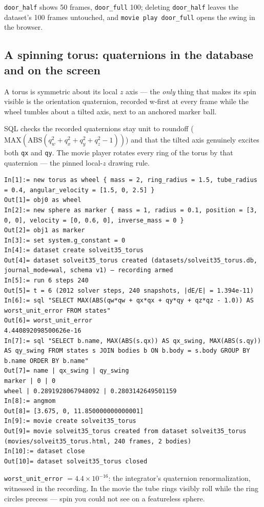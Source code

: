 \documentclass[11pt]{article}
\newcommand{\code}[1]{\texttt{#1}}
\begin{document}
\code{door\_half} shows 50 frames, \code{door\_full} 100; deleting
\code{door\_half} leaves the dataset's 100 frames untouched, and
\code{movie play door\_full} opens the swing in the browser.

\subsection{A spinning torus: quaternions in the database and on the screen}

A torus is symmetric about its local $z$ axis --- the \emph{only}
thing that makes its spin visible is the orientation quaternion,
recorded w-first at every frame while the wheel tumbles about a tilted
axis, next to an anchored marker ball.

SQL checks the recorded quaternions stay unit to roundoff
($\mathrm{MAX}(\mathrm{ABS}(q_w^2+q_x^2+q_y^2+q_z^2-1))$) and that the
tilted axis genuinely excites both \code{qx} and \code{qy}. The movie
player rotates every ring of the torus by that quaternion --- the
pinned local-$z$ drawing rule.

\begin{lstlisting}
In[1]:= new torus as wheel { mass = 2, ring_radius = 1.5, tube_radius = 0.4, angular_velocity = [1.5, 0, 2.5] }
Out[1]= obj0 as wheel
In[2]:= new sphere as marker { mass = 1, radius = 0.1, position = [3, 0, 0], velocity = [0, 0.6, 0], inverse_mass = 0 }
Out[2]= obj1 as marker
In[3]:= set system.g_constant = 0
In[4]:= dataset create solveit35_torus
Out[4]= dataset solveit35_torus created (datasets/solveit35_torus.db, journal_mode=wal, schema v1) — recording armed
In[5]:= run 6 steps 240
Out[5]= t = 6 (2012 solver steps, 240 snapshots, |dE/E| = 1.394e-11)
In[6]:= sql "SELECT MAX(ABS(qw*qw + qx*qx + qy*qy + qz*qz - 1.0)) AS worst_unit_error FROM states"
Out[6]= worst_unit_error
4.440892098500626e-16
In[7]:= sql "SELECT b.name, MAX(ABS(s.qx)) AS qx_swing, MAX(ABS(s.qy)) AS qy_swing FROM states s JOIN bodies b ON b.body = s.body GROUP BY b.name ORDER BY b.name"
Out[7]= name | qx_swing | qy_swing
marker | 0 | 0
wheel | 0.2891928067948092 | 0.2803142649501159
In[8]:= angmom
Out[8]= [3.675, 0, 11.850000000000001]
In[9]:= movie create solveit35_torus
Out[9]= movie solveit35_torus created from dataset solveit35_torus (movies/solveit35_torus.html, 240 frames, 2 bodies)
In[10]:= dataset close
Out[10]= dataset solveit35_torus closed
\end{lstlisting}

\code{worst\_unit\_error} $= 4.4\times10^{-16}$: the integrator's
quaternion renormalization, witnessed in the recording. In the movie
the tube rings visibly roll while the ring circles precess --- spin
you could not see on a featureless sphere.
\end{document}
